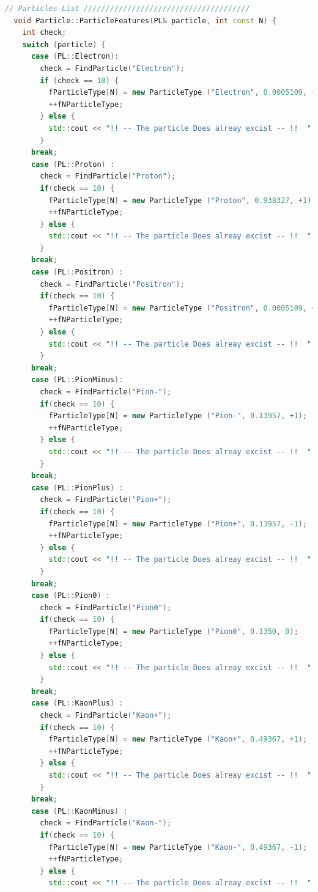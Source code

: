\documentclass[a4paper, 11pt]{article}
\begin{document}
\begin{lstlisting}[language=c++, style=code]
  // Particles List //////////////////////////////////////
  void Particle::ParticleFeatures(PL& particle, int const N) {
    int check;
    switch (particle) {
      case (PL::Electron):
        check = FindParticle("Electron");
        if (check == 10) {
          fParticleType[N] = new ParticleType ("Electron", 0.0005109, -1);
          ++fNParticleType;
        } else {
          std::cout << "!! -- The particle Does alreay excist -- !!  " << '\n';
        }
      break;
      case (PL::Proton) :
        check = FindParticle("Proton");
        if(check == 10) {
          fParticleType[N] = new ParticleType ("Proton", 0.938327, +1);
          ++fNParticleType;
        } else {
          std::cout << "!! -- The particle Does alreay excist -- !!  " << '\n';
        }
      break;
      case (PL::Positron) :
        check = FindParticle("Positron");
        if(check == 10) {
          fParticleType[N] = new ParticleType ("Positron", 0.0005109, +1);
          ++fNParticleType;
        } else {
          std::cout << "!! -- The particle Does alreay excist -- !!  " << '\n';
        }
      break;
      case (PL::PionMinus):
        check = FindParticle("Pion-");
        if(check == 10) {
          fParticleType[N] = new ParticleType ("Pion-", 0.13957, +1);
          ++fNParticleType;
        } else {
          std::cout << "!! -- The particle Does alreay excist -- !!  " << '\n';
        }
      break;
      case (PL::PionPlus) :
        check = FindParticle("Pion+");
        if(check == 10) {
          fParticleType[N] = new ParticleType ("Pion+", 0.13957, -1);
          ++fNParticleType;
        } else {
          std::cout << "!! -- The particle Does alreay excist -- !!  " << '\n';
        }
      break;
      case (PL::Pion0) :
        check = FindParticle("Pion0");
        if(check == 10) {
          fParticleType[N] = new ParticleType ("Pion0", 0.1350, 0);
          ++fNParticleType;
        } else {
          std::cout << "!! -- The particle Does alreay excist -- !!  " << '\n';
        }
      break;
      case (PL::KaonPlus) :
        check = FindParticle("Kaon+");
        if(check == 10) {
          fParticleType[N] = new ParticleType ("Kaon+", 0.49367, +1);
          ++fNParticleType;
        } else {
          std::cout << "!! -- The particle Does alreay excist -- !!  " << '\n';
        }
      break;
      case (PL::KaonMinus) :
        check = FindParticle("Kaon-");
        if(check == 10) {
          fParticleType[N] = new ParticleType ("Kaon-", 0.49367, -1);
          ++fNParticleType;
        } else {
          std::cout << "!! -- The particle Does alreay excist -- !!  " << '\n';

\end{lstlisting}
\end{document}
